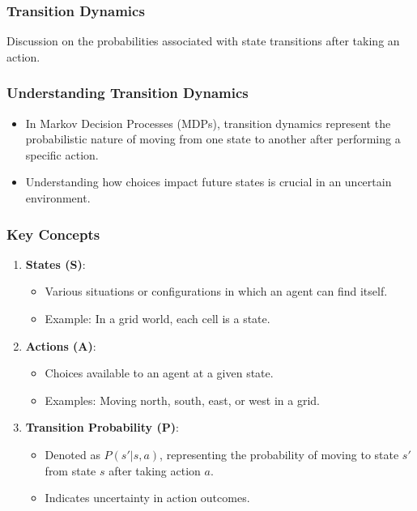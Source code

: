 \documentclass[aspectratio=169]{beamer}
\begin{document}
\begin{frame}[fragile]
    \frametitle{Transition Dynamics}
    Discussion on the probabilities associated with state transitions after taking an action.
\end{frame}

\begin{frame}[fragile]
    \frametitle{Understanding Transition Dynamics}
    \begin{itemize}
        \item In Markov Decision Processes (MDPs), transition dynamics represent the probabilistic nature of moving from one state to another after performing a specific action.
        \item Understanding how choices impact future states is crucial in an uncertain environment.
    \end{itemize}
\end{frame}

\begin{frame}[fragile]
    \frametitle{Key Concepts}
    \begin{enumerate}
        \item \textbf{States (S)}:
            \begin{itemize}
                \item Various situations or configurations in which an agent can find itself.
                \item Example: In a grid world, each cell is a state.
            \end{itemize}
        \item \textbf{Actions (A)}:
            \begin{itemize}
                \item Choices available to an agent at a given state.
                \item Examples: Moving north, south, east, or west in a grid.
            \end{itemize}
        \item \textbf{Transition Probability (P)}:
            \begin{itemize}
                \item Denoted as $P(s' | s, a)$, representing the probability of moving to state $s'$ from state $s$ after taking action $a$.
                \item Indicates uncertainty in action outcomes.
            \end{itemize}
    \end{enumerate}
\end{frame}
\end{document}
